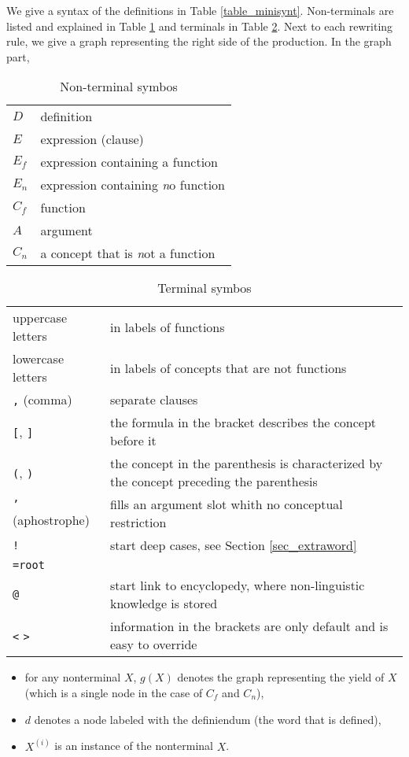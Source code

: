 \documentclass[a4paper,10pt]{article}
\begin{document}
We give a syntax of the definitions in Table \ref{table_minisynt}. Non-terminals are listed and explained in Table \ref{table_nont} and terminals  in Table \ref{table_termin}. Next to each rewriting rule, we give a graph representing the right side of the production. In the graph part,
\begin{table}
\begin{center}
\begin{tabular}{ll}
 $D$ & definition
\\ $ E $ & expression (clause)
\\ $ E_f $ & expression containing a function
\\ $ E_n  $ & expression containing \emph{n}o function
\\ $ C_f $ & function 
\\ $ A $ & argument 
\\ $ C_n $ & a concept that is \emph{n}ot a function
\end{tabular}
\end{center}
\caption{Non-terminal symbos}
\label{table_nont}
\end{table}
\begin{table}
\begin{center}
\begin{tabular}{ll}
 uppercase letters & in labels of functions
\\ lowercase letters & in labels of concepts that are not functions
\\ \texttt{,} (comma) & separate clauses
\\ \texttt{[}, \texttt{]} & the formula in the bracket describes the concept before it
\\ \texttt{(}, \texttt{)} & the concept in the parenthesis is characterized by the concept preceding the parenthesis
\\ \texttt{'} (aphostrophe) & fills an argument slot whith no conceptual restriction
\\ \texttt{!} & start deep cases, see Section \ref{sec_extraword}
\\ \texttt{=root} &
\\ \texttt{@} & start link to encyclopedy, where non-linguistic knowledge is stored
\\ \texttt{<} \texttt{>}& information in the brackets are only default and is easy to override
\end{tabular}
\end{center}
\caption{Terminal symbos}
\label{table_termin}
\end{table}
\begin{itemize}
 \item for any nonterminal $X$, $g(X)$ denotes the graph representing the yield of $X$ (which is a single node in the case of $C_f$ and $C_n$),
 \item $d$ denotes a node labeled with the definiendum (the word that is defined),
 \item $X^{(i)}$ is an instance of the nonterminal $X$.
\end{itemize}
\end{document}
